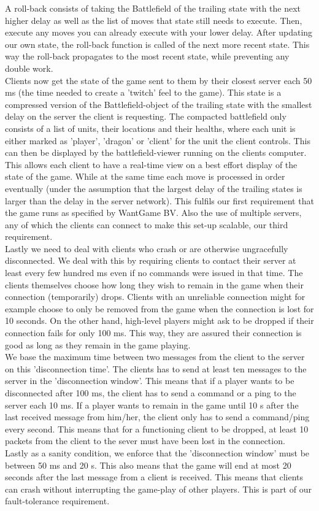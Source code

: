A roll-back consists of taking the Battlefield of the trailing state with the next higher delay as well as the list of moves that state still needs to execute. Then, execute any moves you can already execute with your lower delay. After updating our own state, the roll-back function is called of the next more recent state. This way the roll-back propagates to the most recent state, while preventing any double work. \\
Clients now get the state of the game sent to them by their closest server each 50 ms (the time needed to create a 'twitch' feel to the game). This state is a compressed version of the Battlefield-object of the trailing state with the smallest delay on the server the client is requesting. The compacted battlefield only consists of a list of units, their locations and their healths, where each unit is either marked as 'player', 'dragon' or 'client' for the unit the client controls. This can then be displayed by the battlefield-viewer running on the clients computer.\\
This allows each client to have a real-time view on a best effort display of the state of the game. While at the same time each move is processed in order eventually (under the assumption that the largest delay of the trailing states is larger than the delay in the server network). This fulfils our first requirement that the game runs as specified by WantGame BV. Also the use of multiple servers, any of which the clients can connect to make this set-up scalable, our third requirement.\\
Lastly we need to deal with clients who crash or are otherwise ungracefully disconnected. We deal with this by requiring clients to contact their server at least every few hundred ms even if no commands were issued in that time. The clients themselves choose how long they wish to remain in the game when their connection (temporarily) drops. Clients with an unreliable connection might for example choose to only be removed from the game when the connection is lost for 10 seconds. On the other hand, high-level players might ask to be dropped if their connection fails for only 100 ms. This way, they are assured their connection is good as long as they remain in the game playing. \\
We base the maximum time between two messages from the client to the server on this 'disconnection time'. The clients has to send at least ten messages to the server in the 'disconnection window'. This means that if a player wants to be disconnected after 100 ms, the client has to send a command or a ping to the server each 10 ms. If a player wants to remain in the game until 10 s after the last received message from him/her, the client only has to send a command/ping every second. This means that for a functioning client to be dropped, at least 10 packets from the client to the sever must have been lost in the connection. \\
Lastly as a sanity condition, we enforce that the 'disconnection window' must be between 50 ms and 20 s. This also means that the game will end at most 20 seconds after the last message from a client is received. This means that clients can crash without interrupting the game-play of other players. This is part of our fault-tolerance requirement.